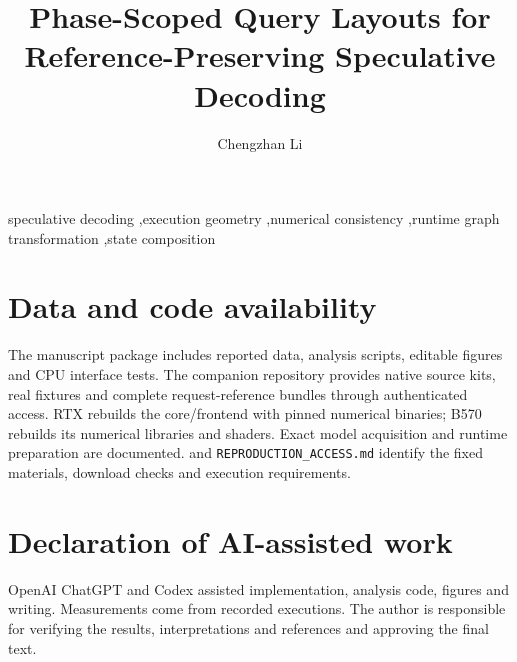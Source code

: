 \documentclass[final,5p,times,twocolumn]{elsarticle}
\begin{document}
\begin{frontmatter}
\title{Phase-Scoped Query Layouts for Reference-Preserving Speculative Decoding}
\author{Chengzhan Li}
\address{University of Electronic Science and Technology of China, Chengdu, China\\[2pt]
{\normalfont\ttfamily\href{mailto:chengzhan.li@std.uestc.edu.cn}{chengzhan.li@std.uestc.edu.cn}}}
\begin{abstract}\end{abstract}
\begin{keyword}
speculative decoding \sep execution geometry \sep numerical consistency \sep runtime graph transformation \sep state composition
\end{keyword}
\end{frontmatter}












\section*{Data and code availability}
The manuscript package includes reported data, analysis scripts, editable figures and CPU interface tests. The companion repository provides native source kits, real fixtures and complete request-reference bundles through authenticated access. RTX rebuilds the core/frontend with pinned numerical binaries; B570 rebuilds its numerical libraries and shaders. Exact model acquisition and runtime preparation are documented.  and \texttt{REPRODUCTION\_ACCESS.md} identify the fixed materials, download checks and execution requirements.
\section*{Declaration of AI-assisted work}
OpenAI ChatGPT and Codex assisted implementation, analysis code, figures and writing. Measurements come from recorded executions. The author is responsible for verifying the results, interpretations and references and approving the final text.
\balance
\setlength{\bibsep}{0pt plus .1pt minus .1pt}


\clearpage
\nobalance










\balance

\end{document}
